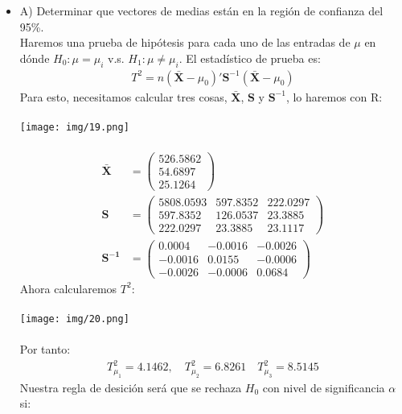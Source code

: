 \begin{sol}
\begin{itemize}
\item A) Determinar que vectores de medias están en la región de confianza del 95\%. \\
Haremos una prueba de hipótesis para cada uno de las entradas de $\mu$ en dónde $H_0 : \mu = \mu_i$ v.s. $H_1:\mu \neq \mu_i$. El estadístico de prueba es:
\begin{align*}
T^2=n(\bar{\mathbf{X}} - \mu_0)'\mathbf{S}^{-1}(\mathbf{\bar{X}}-\mu_0)
\end{align*}
Para esto, necesitamos calcular tres cosas, $\mathbf{\bar{X}}$, $\mathbf{S}$ y $\mathbf{S}^{-1}$, lo haremos con R:\\\\
\texttt{[image: img/19.png]}\\\\
\begin{align*}
    \mathbf{\bar{X}}&= \begin{pmatrix} 
        526.5862 \\ 
        54.6897 \\ 
        25.1264 
    \end{pmatrix} \\
    \mathbf{S} &= \begin{pmatrix}
        5808.0593 & 597.8352 & 222.0297 \\ 
        597.8352 & 126.0537 & 23.3885 \\ 
        222.0297 & 23.3885 & 23.1117 
    \end{pmatrix} \\
    \mathbf{S^{-1}} &= \begin{pmatrix}
        0.0004 & -0.0016 & -0.0026 \\ 
        -0.0016 & 0.0155 & -0.0006 \\ 
        -0.0026 & -0.0006 & 0.0684
    \end{pmatrix}
\end{align*}
Ahora calcularemos $T^2$:\\\\
\texttt{[image: img/20.png]}\\\\
Por tanto:
\begin{align*}
T_{\mu_1}^2=4.1462,\quad T_{\mu_2}^2=6.8261 \quad T_{\mu_3}^2=8.5145
\end{align*}
Nuestra regla de desición será que se rechaza $H_0$ con nivel de significancia $\alpha$ si:

\end{itemize}
\end{sol}
